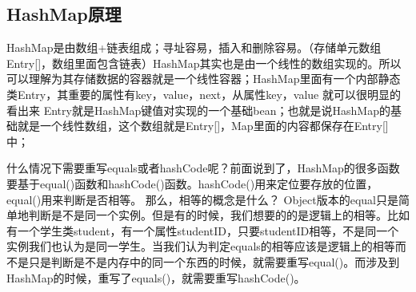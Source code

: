\documentclass[../../../interview-questions.tex]{subfiles}
\begin{document}
\subsection{HashMap原理}

HashMap是由数组+链表组成；寻址容易，插入和删除容易。（存储单元数组Entry[]，数组里面包含链表）HashMap其实也是由一个线性的数组实现的。所以可以理解为其存储数据的容器就是一个线性容器；HashMap里面有一个内部静态类Entry，其重要的属性有key，value，next，从属性key，value 就可以很明显的看出来 Entry就是HashMap键值对实现的一个基础bean；也就是说HashMap的基础就是一个线性数组，这个数组就是Entry[]，Map里面的内容都保存在Entry[]中；

什么情况下需要重写equals或者hashCode呢？前面说到了，HashMap的很多函数要基于equal()函数和hashCode()函数。hashCode()用来定位要存放的位置，equal()用来判断是否相等。
那么，相等的概念是什么？
Object版本的equal只是简单地判断是不是同一个实例。但是有的时候，我们想要的的是逻辑上的相等。比如有一个学生类student，有一个属性studentID，只要studentID相等，不是同一个实例我们也认为是同一学生。当我们认为判定equals的相等应该是逻辑上的相等而不是只是判断是不是内存中的同一个东西的时候，就需要重写equal()。而涉及到HashMap的时候，重写了equals()，就需要重写hashCode()。
\end{document}
